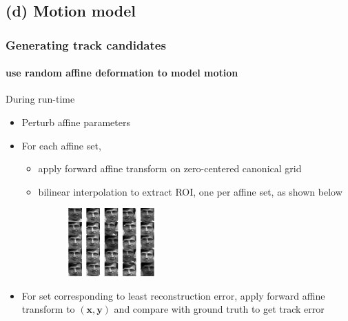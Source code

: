 \subsection{(d) Motion model}
\begin{frame}
\frametitle{Generating track candidates}
\framesubtitle{use random affine deformation to model motion}
\logoCSIPCPL\mypagenum
During run-time
\begin{itemize}
\item Perturb affine parameters
\item For each affine set, 
\begin{itemize}
\item apply forward affine transform on zero-centered canonical grid 
\item bilinear interpolation to extract ROI, one per affine set, as shown below
\begin{figure}[t]
\centering
\includegraphics[width=0.35\textwidth]{thesis/affineCandidates.pdf}
\label{Fig:affine_candidates}
\end{figure}
\end{itemize}
\item For set corresponding to least reconstruction error, apply forward affine transform to $(\mathbf{x, y})$ and compare with ground truth to get track error
\end{itemize}
\end{frame}








